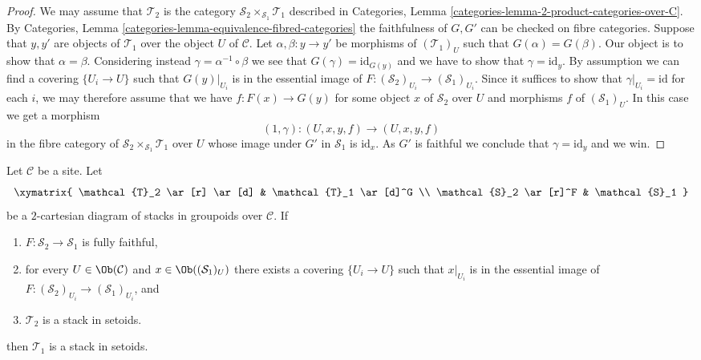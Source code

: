 \begin{proof}
We may assume that $\mathcal{T}_2$ is the category
$\mathcal{S}_2 \times_{\mathcal{S}_1} \mathcal{T}_1$
described in
Categories, Lemma \ref{categories-lemma-2-product-categories-over-C}.
By
Categories, Lemma \ref{categories-lemma-equivalence-fibred-categories}
the faithfulness of $G, G'$ can be checked on fibre categories.
Suppose that $y, y'$ are objects of $\mathcal{T}_1$ over the object $U$
of $\mathcal{C}$. Let $\alpha, \beta : y \to y'$ be morphisms of
$(\mathcal{T}_1)_U$ such that $G(\alpha) = G(\beta)$. Our object is to
show that $\alpha = \beta$. Considering instead
$\gamma = \alpha^{-1} \circ \beta$ we see that $G(\gamma) = \text{id}_{G(y)}$
and we have to show that $\gamma = \text{id}_y$. By assumption we
can find a covering $\{U_i \to U\}$ such that $G(y)|_{U_i}$ is in the
essential image of $F :(\mathcal{S}_2)_{U_i} \to (\mathcal{S}_1)_{U_i}$.
Since it suffices to show that $\gamma|_{U_i} = \text{id}$ for each $i$,
we may therefore assume that we have
$f : F(x) \to G(y)$ for some object $x$ of $\mathcal{S}_2$ over $U$
and morphisms $f$ of $(\mathcal{S}_1)_U$. In this case we get
a morphism
$$
(1, \gamma) : (U, x, y, f) \longrightarrow (U, x, y, f)
$$
in the fibre category of $\mathcal{S}_2 \times_{\mathcal{S}_1} \mathcal{T}_1$
over $U$ whose image under $G'$ in $\mathcal{S}_1$ is $\text{id}_x$.
As $G'$ is faithful we conclude that $\gamma = \text{id}_y$ and we win.
\end{proof}

\begin{lemma}
\label{lemma-stack-in-setoids-descent}
Let $\mathcal{C}$ be a site.
Let
$$
\xymatrix{
\mathcal{T}_2 \ar[r] \ar[d] & \mathcal{T}_1 \ar[d]^G \\
\mathcal{S}_2 \ar[r]^F & \mathcal{S}_1
}
$$
be a $2$-cartesian diagram of stacks in groupoids over $\mathcal{C}$.
If
\begin{enumerate}
\item $F : \mathcal{S}_2 \to \mathcal{S}_1$ is fully faithful,
\item for every $U \in \Ob(\mathcal{C})$ and
$x \in \Ob((\mathcal{S}_1)_U)$ there exists a covering
$\{U_i \to U\}$ such that $x|_{U_i}$ is in the essential
image of $F : (\mathcal{S}_2)_{U_i} \to (\mathcal{S}_1)_{U_i}$, and
\item $\mathcal{T}_2$ is a stack in setoids.
\end{enumerate}
then $\mathcal{T}_1$ is a stack in setoids.
\end{lemma}

